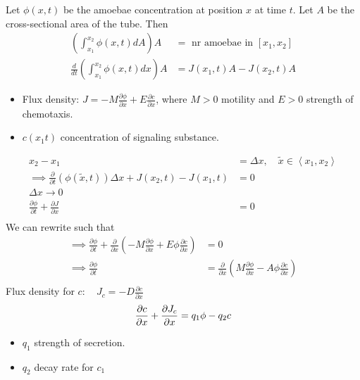 \documentclass{article}
\theoremstyle{remark}
\begin{document}
  Let $\phi \left( x,t \right)$ be the amoebae concentration at position $x$ at time $t$. Let $A$ be the cross-sectional area of the tube. Then \[
    \begin{split}
  \left( \int_{x_{1}}^{x_{2}}  \phi \left( x,t \right) dA \right) A  & = \text{ nr amoebae in } \left[ x_{1}, x_{2} \right] \\
  \frac{d }{d t} \left( \int_{x_{1}}^{x_{2}}  \phi \left( x,t \right) dx \right)A  & = J\left( x_{1}, t \right) A - J \left( x_{2}, t \right) A 
    \end{split} 
  \]  
  \begin{itemize}
    \item Flux density: $\displaystyle J = - M \frac{\partial \phi }{\partial x} + E \frac{\partial c}{\partial x}  $, where $M>0$ motility and $E >0$  strength of chemotaxis.
    \item $c \left( x_{1}t \right)$ concentration of signaling substance. 
  \end{itemize}
 \[
   \begin{split}
 x_{2} - x_{1}  & = \Delta x, \quad \widetilde{x} \in  \left<x_{1}, x_{2} \right>  \\
 \implies \frac{\partial }{\partial t}  \left( \phi \left( \widetilde{x}, t  \right) \right) \Delta x  + J \left( x_{2}, t \right) - J\left( x_{1},t \right) &= 0 \\
 \Delta x \to  0  & \\
 \frac{\partial \phi }{\partial t } + \frac{\partial J}{\partial x}   &= 0   \\
   \end{split} 
 \]  
 We can rewrite such that \[
   \begin{split}
 \implies  \frac{\partial \phi }{\partial t}  + \frac{\partial }{\partial x}  \left( -M \frac{\partial \phi }{\partial x}  + E \phi \frac{\partial c}{\partial x}  \right)   &=  0 \\
 \implies  \frac{\partial \phi }{\partial t}  &=  \frac{\partial }{\partial x} \left( M \frac{\partial \phi }{\partial x}  - A \phi  \frac{\partial c}{\partial x}  \right) \\
   \end{split} 
 \] 
 Flux density for $c: \quad J_{c}= - D \frac{\partial c}{\partial x}  $  \[
   \frac{\partial c}{\partial x} + \frac{\partial J_{c}}{\partial x}  =  q_{1} \phi  - q_{2} c \\
 \] 
 \begin{itemize}
   \item $q_{1}$ strength of secretion.
   \item $q_{2}$ decay rate for $c_{1}$
 \end{itemize}
\end{document}
